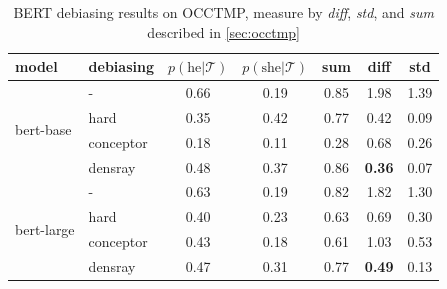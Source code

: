 \begin{table}[ht]
\vspace{-5pt}
\centering
\footnotesize
\setlength{\abovecaptionskip}{0.2cm}   
\setlength{\belowcaptionskip}{0cm}
\begin{tabular}{llccccc}
	\toprule
	model & debiasing &$p(\text{he} | {\mathcal T})$ & $p(\text{she} | {\mathcal T})$& sum & diff & std\\
	\midrule
	\multirow{4}{2cm}{bert-base} & - & 0.66 & 0.19 & 0.85 &1.98&1.39\\
	&hard & 0.35 & 0.42 & 0.77&0.42&0.09\\
	&conceptor & 0.18 & 0.11 & 0.28 & 0.68&0.26\\
	&densray & 0.48 & 0.37 & 0.86&\textbf{0.36}&0.07\\
	\midrule
	\multirow{4}{2cm}{bert-large} & -  & 0.63 & 0.19 & 0.82  &1.82&1.30\\
	&hard & 0.40 & 0.23 & 0.63&0.69&0.30\\
	&conceptor & 0.43 & 0.18 & 0.61 & 1.03&0.53\\
	&densray  & 0.47 & 0.31 & 0.77&\textbf{0.49}&0.13 \\
	\bottomrule
\end{tabular}
\caption{ BERT debiasing results on OCCTMP, measure by \textit{diff}, \textit{std}, and \textit{sum} described in \ref{sec:occtmp}}

\vspace{0.4cm}


\end{table}
